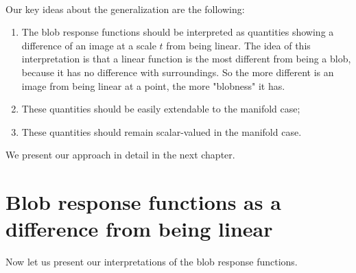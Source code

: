 \documentclass[twocolumn]{svjour3}          %
\begin{document}
\\
Our key ideas about the generalization are the following:
\begin{enumerate}
\item The blob response functions should be interpreted as quantities showing a difference of an image at a scale $t$ from being linear. The idea of this interpretation is that a linear function is the most different from being a blob, because it has no difference with surroundings. So the more different is an image from being linear at a point, the more "blobness" it has.
\item These quantities should be easily extendable to the manifold case;
\item These quantities should remain scalar-valued in the manifold case.
\end{enumerate}
We present our approach in detail in the next chapter.

\section{Blob response functions as a difference from being linear}
Now let us present our interpretations of the blob response functions.
\end{document}
